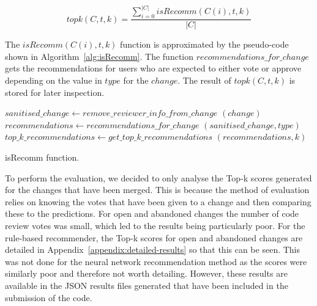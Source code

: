 \begin{equation} \label{eq:top-k}
topk(C, t, k) = \frac{\sum_{i=0}^{|C|} isRecomm(C(i),t,k)}{|C|}
\end{equation}
\hspace{0.25cm}

The \(isRecomm(C(i), t, k)\) function is approximated by the pseudo-code shown in Algorithm~\ref{alg:isRecomm}. The function \(recommendations\_for\_change\) gets the recommendations for users who are expected to either vote or approve depending on the value in \(type\) for the \(change\). The result of \(topk(C, t, k)\) is stored for later inspection.

\hspace{0.25cm}

\begin{algorithm}[H]
	 {
            $sanitised\_change \gets remove\_reviewer\_info\_from\_change$ $(change)$\;
            $recommendations \gets recommendations\_for\_change$ $(sanitised\_change, type)$\;
            $top\_k\_recommendations \gets get\_top\_k\_recommendations$ $(recommendations, k)$\;
             {
                 {
                    \;
                }
            }
            \;
	}
	\caption
	{\label{alg:isRecomm}isRecomm function.}
\end{algorithm}

\hspace{0.25cm}
\label{para:evaluation-top-k-only-using-merged}To perform the evaluation, we decided to only analyse the Top-k scores generated for the changes that have been merged. This is because the method of evaluation relies on knowing the votes that have been given to a change and then comparing these to the predictions. For open and abandoned changes the number of code review votes was small, which led to the results being particularly poor. For the rule-based recommender, the Top-k scores for open and abandoned changes are detailed in Appendix~\ref{appendix:detailed-results} so that this can be seen. This was not done for the neural network recommendation method as the scores were similarly poor and therefore not worth detailing. However, these results are available in the JSON results files generated that have been included in the submission of the code. 

